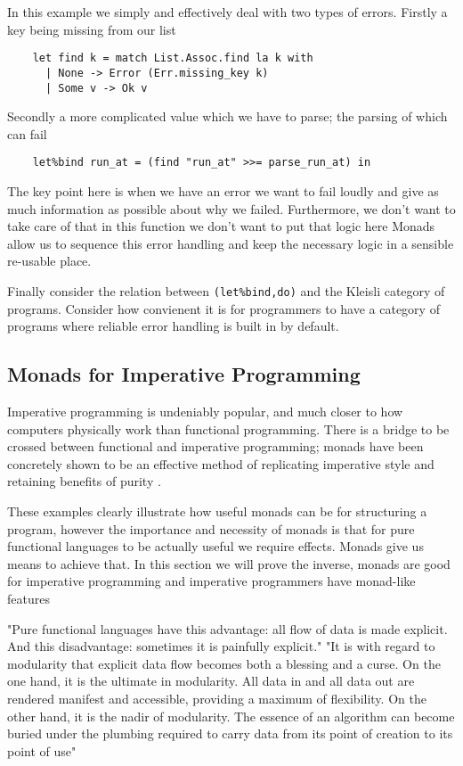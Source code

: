 In this example we simply and effectively deal with two types of errors.
Firstly a key being missing from our list
\begin{verbatim}
    let find k = match List.Assoc.find la k with
      | None -> Error (Err.missing_key k)
      | Some v -> Ok v
\end{verbatim}
Secondly a more complicated value which we have to parse;
the parsing of which can fail
\begin{verbatim}
    let%bind run_at = (find "run_at" >>= parse_run_at) in
\end{verbatim}
The key point here is when we have an error we want to fail
loudly and give as much information as possible about why we failed.
Furthermore, we don't want to take care of that in this function
we don't want to put that logic here
Monads allow us to sequence this error handling
and keep the necessary logic in a sensible re-usable place.

Finally consider the relation between
\texttt{(let\%bind,do)} and the Kleisli category of programs.
Consider how convienent it is for programmers to have a category
of programs where reliable error handling is built in by default.

\subsection{Monads for Imperative Programming}
Imperative programming is undeniably popular,
and much closer to how computers physically work than functional programming.
There is a bridge to be crossed between functional and imperative programming;
monads have been concretely shown to be an effective method of replicating
imperative style and retaining benefits of purity \cite{PeytonJones:1993}.

These examples clearly illustrate how useful monads can be for structuring a program,
however the importance and necessity of monads is that for pure functional languages
to be actually useful we require effects. Monads give us means to achieve that.
In this section we will prove the inverse,
monads are good for imperative programming
and imperative programmers have monad-like features

"Pure functional languages have this advantage:
all flow of data is made explicit. And this disadvantage: sometimes it is painfully explicit."
"It is with regard to modularity that explicit data flow becomes both a blessing and a curse.
On the one hand, it is the ultimate in modularity.
All data in and all data out are rendered manifest and accessible, providing a maximum of flexibility. On the other hand, it is the nadir of modularity. The essence of an algorithm can become buried under the plumbing required to carry data from its point of creation to its point of use"
\cite{wadler1995monads}

